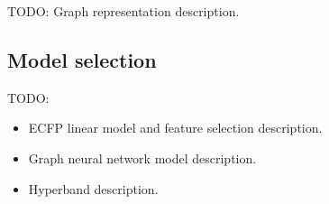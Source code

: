 TODO: Graph representation description.

\subsection{Model selection}

TODO:
\begin{itemize}
    \item ECFP linear model and feature selection description.
    \item Graph neural network model description.
    \item Hyperband description.
\end{itemize}